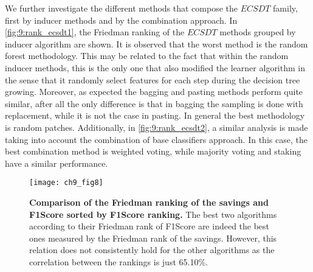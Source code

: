 {  We further investigate the different methods that compose the $ECSDT$ family, first by inducer 
  methods and by the combination approach. In \figurename{ \ref{fig:9:rank_ecsdt1}}, the Friedman 
  ranking of the $ECSDT$ methods grouped by inducer algorithm are shown. It is observed that the 
  worst method is the random forest methodology. This may be related to the fact that within the 
  random inducer methods, this is the only one that also modified the learner algorithm in the 
  sense that it randomly select features for each step during the decision tree growing. Moreover, 
  as expected the bagging and pasting methods perform quite similar, after all the only difference 
  is that in bagging the sampling is done with replacement, while it is not the case in pasting. 
  In  general the best methodology is random patches. Additionally, in \figurename{ 
  \ref{fig:9:rank_ecsdt2}}, a similar analysis is made taking into account the combination of base 
  classifiers approach. In this case, the best combination method is weighted voting, while 
  majority voting and staking have a similar performance.

  \begin{figure}[t!]
  \centering
  \texttt{[image: ch9\_fig8]}
  \caption{\textbf{Comparison of the Friedman ranking of the savings and F1Score sorted by F1Score 
  ranking.} The best two algorithms according to their Friedman rank of F1Score are indeed the 
  best ones measured by the Friedman rank of the savings. However, this relation does not 
  consistently hold for the other algorithms as the correlation between the rankings is just 
  65.10\%.}
  \label{fig:9:friedman_vs_fscore}
  \end{figure}

}
